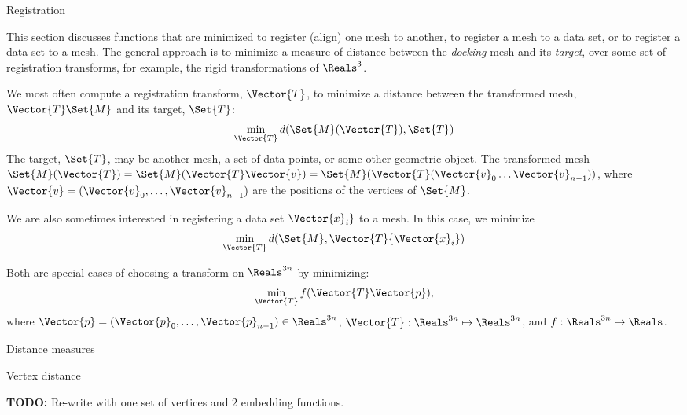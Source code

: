 \begin{plSection}{Registration}
\label{sec:registration}

This section discusses functions that are minimized
to register (align) one mesh to another,
to register a mesh to a data set,
or to register a data set to a mesh.
The general approach is to minimize
a measure of distance between the {\it docking} mesh and its {\it target},
over some set of registration transforms,
for example, the rigid transformations of $\Reals^3$.

We most often compute a registration transform, $\Vector{T}$,
to minimize a distance between the transformed mesh,
$\Vector{T}\Set{M}$ and its target, $\Set{T}$:
\begin{equation}
\min_{\Vector{T}} d(\Set{M}(\Vector{T}),\Set{T})
\end{equation}
The target, $\Set{T}$, may be another mesh, a set of data points,
or some other geometric object.
The transformed mesh
$\Set{M}(\Vector{T})
 = \Set{M}(\Vector{T}\Vector{v}) 
 = \Set{M}(\Vector{T}(\Vector{v}_0 \ldots \Vector{v}_{n-1}))$,
where $\Vector{v} = (\Vector{v}_0, \ldots , \Vector{v}_{n-1})$
are the positions of the vertices of $\Set{M}$.

We are also sometimes interested in registering a data set
$\Vector{x}_i\}$ to a mesh.
In this case, we minimize
\begin{equation}
\min_{\Vector{T}} d(\Set{M},\Vector{T}\{\Vector{x}_i\})
\end{equation}

Both are special cases of choosing a transform on $\Reals^{3n}$
by minimizing:
\begin{equation}
\min_{\Vector{T}} f( \Vector{T} \Vector{p}),
\end{equation}
where
$\Vector{p} = (\Vector{p}_0, \ldots , \Vector{p}_{n-1}) \in \Reals^{3n}$,
$\Vector{T} : \Reals^{3n} \mapsto \Reals^{3n}$,
and
$f : \Reals^{3n} \mapsto \Reals$.

\begin{plSection}{Distance measures}
\label{sec:Distance-measures}

\begin{plSection}{Vertex distance}
\label{sec:Vertex-distance}

\textbf{TODO:} Re-write with one set of vertices and $2$
embedding functions.


\end{plSection}
\end{plSection}
\end{plSection}
